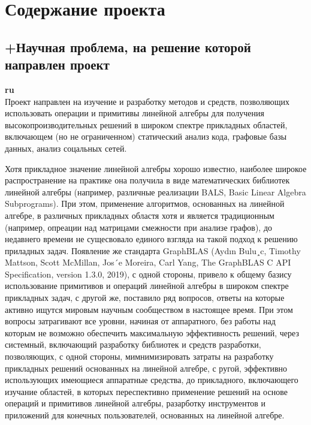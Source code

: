 \documentclass[12pt]{article}  %
\theoremstyle{remark}
\begin{document}
\section{Содержание проекта}

\subsection{+Научная проблема, на решение которой направлен проект}

\textbf{ru}\\
%
Проект направлен на изучение и разработку методов и средств, позволяющих использовать операции и примитивы линейной алгебры для получения высокопроизводительных решений в широком спектре прикладных областей, включающем (но не ограниченном) статический анализ кода, графовые базы данных, анализ соцальных сетей.

Хотя прикладное значение линейной алгебры хорошо известно, наиболее широкое распространение на практике она получила в виде математических библиотек линейной алгебры (например, различные реализации BALS, Basic Linear Algebra Subprograms). При этом, применение алгоритмов, основанных на линейной алгебре, в различных прикладных областя хотя и является традиционным (например, опреации над матрицами смежности при анализе графов), до недавнего времени не сущесвовало единого взгляда на такой подход к решению приладных задач. Появление же стандарта GraphBLAS (Aydın Bulu¸c, Timothy Mattson, Scott McMillan, Jos´e Moreira, Carl Yang, The GraphBLAS C API Specification, version 1.3.0, 2019), с одной стороны, привело к общему базису использование примитивов и операций линейной алгебры в широком спектре прикладных задач, с другой же, поставило ряд вопросов, ответы на которые активно ищутся мировым научным сообществом в настоящее время. При этом вопросы затрагивают все уровни, начиная от аппаратного, без работы над которым не возможно обеспечить максимальную эффективность решений, через системный, включающий разработку библиотек и средств разработки, позволяющих, с одной стороны, мимнимизировать затраты на разработку прикладных решений основанных на линейной алгебре, с ругой, эффективно использующих имеющиеся аппаратные средства, до прикладного, включающего изучание областей, в которых переспективно применение решений на основе операций и примитивов линейной алгебры, разарботку инструментов и приложений для конечных пользователей, основанных на линейной алгебре.
\end{document}
